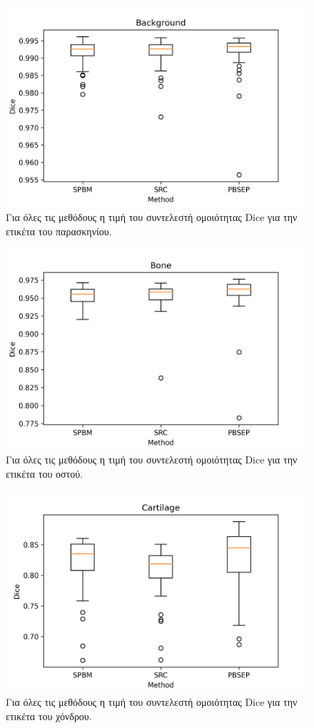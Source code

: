 \documentclass[a4paper,12pt]{article}
\begin{document}
\begin{figure}[H]
    \centering
    \includegraphics[width=0.85\linewidth]{Dice_final_Background_plot.png}
    \caption{Για όλες τις μεθόδους η τιμή του συντελεστή ομοιότητας Dice για την
             ετικέτα του παρασκηνίου.}
    \label{fig:dice_final:1}
\end{figure}

\begin{figure}[H]
    \centering
    \includegraphics[width=0.85\linewidth]{Dice_final_Bone_plot.png}
    \caption{Για όλες τις μεθόδους η τιμή του συντελεστή ομοιότητας Dice για την
             ετικέτα του οστού.}
    \label{fig:dice_final:2}
\end{figure}

\begin{figure}[H]
    \centering
    \includegraphics[width=0.85\linewidth]{Dice_final_Cartilage_plot.png}
    \caption{Για όλες τις μεθόδους η τιμή του συντελεστή ομοιότητας Dice για την
             ετικέτα του χόνδρου.}
    \label{fig:dice_final:3}
\end{figure}
\end{document}
